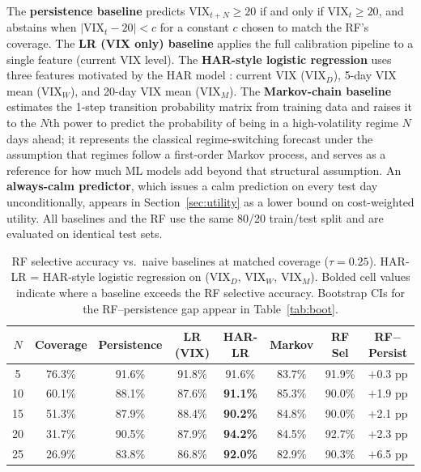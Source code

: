 \documentclass[11pt]{article}
\begin{document}
The \textbf{persistence baseline} predicts $\text{VIX}_{t+N} \geq 20$ if and only if $\text{VIX}_t \geq 20$, and abstains when $|\text{VIX}_t - 20| < c$ for a constant $c$ chosen to match the RF's coverage. The \textbf{LR (VIX only) baseline} applies the full calibration pipeline to a single feature (current VIX level). The \textbf{HAR-style logistic regression} uses three features motivated by the HAR model \citep{corsi2009}: current VIX ($\text{VIX}_D$), 5-day VIX mean ($\text{VIX}_W$), and 20-day VIX mean ($\text{VIX}_M$). The \textbf{Markov-chain baseline} estimates the 1-step transition probability matrix from training data and raises it to the $N$th power to predict the probability of being in a high-volatility regime $N$ days ahead; it represents the classical regime-switching forecast under the assumption that regimes follow a first-order Markov process, and serves as a reference for how much ML models add beyond that structural assumption. An \textbf{always-calm predictor}, which issues a calm prediction on every test day unconditionally, appears in Section~\ref{sec:utility} as a lower bound on cost-weighted utility. All baselines and the RF use the same 80/20 train/test split and are evaluated on identical test sets.

\begin{table}[H]
\centering
\caption{RF selective accuracy vs.\ naive baselines at matched coverage ($\tau = 0.25$). HAR-LR = HAR-style logistic regression on (VIX$_D$, VIX$_W$, VIX$_M$). Bolded cell values indicate where a baseline exceeds the RF selective accuracy. Bootstrap CIs for the RF--persistence gap appear in Table~\ref{tab:boot}.}
\label{tab:baselines}
\begin{tabular}{cccccccc}
\toprule
$N$ & Coverage & Persistence & LR (VIX) & \textbf{HAR-LR} & Markov & RF Sel & RF$-$Persist \\
\midrule
5  & 76.3\% & 91.6\% & 91.8\% & 91.6\% & 83.7\% & 91.9\% & $+$0.3 pp \\
10 & 60.1\% & 88.1\% & 87.6\% & \textbf{91.1\%} & 85.3\% & 90.0\% & $+$1.9 pp \\
15 & 51.3\% & 87.9\% & 88.4\% & \textbf{90.2\%} & 84.8\% & 90.0\% & $+$2.1 pp \\
20 & 31.7\% & 90.5\% & 87.9\% & \textbf{94.2\%} & 84.5\% & 92.7\% & $+$2.3 pp \\
25 & 26.9\% & 83.8\% & 86.8\% & \textbf{92.0\%} & 82.9\% & 90.3\% & $+$6.5 pp \\
\bottomrule
\end{tabular}
\end{table}
\end{document}
